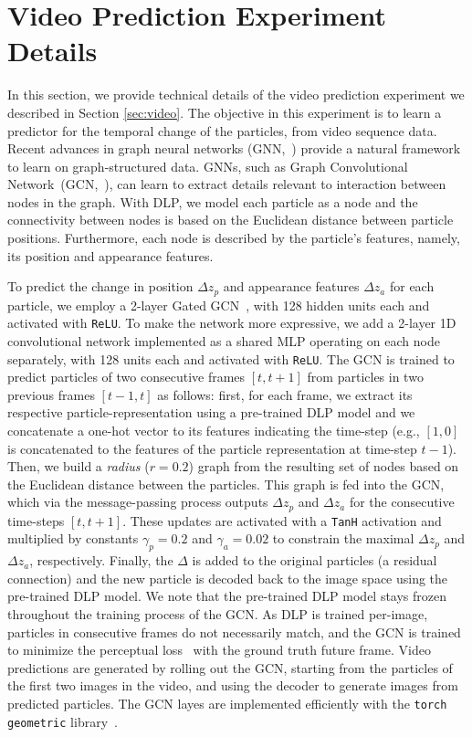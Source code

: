 \documentclass[nohyperref]{article}
\theoremstyle{plain}
\theoremstyle{definition}
\theoremstyle{remark}
\begin{document}
\section{Video Prediction Experiment Details}
\label{apndx:video}
In this section, we provide technical details of the video prediction experiment we described in Section \ref{sec:video}. The objective in this experiment is to learn a predictor for the temporal change of the particles, from video sequence data. Recent advances in graph neural networks (GNN,~\citealt{gnn09}) provide a natural framework to learn on graph-structured data. GNNs, such as Graph Convolutional Network~(GCN,~\citealt{kipf2016gcn}), can learn to extract details relevant to interaction between nodes in the graph. With DLP, we model each particle as a node and the connectivity between nodes is based on the Euclidean distance between particle positions. Furthermore, each node is described by the particle's features, namely, its position and appearance features.

To predict the change in position $\Delta z_p$ and appearance features $\Delta z_a$ for each particle, we employ a 2-layer Gated GCN~\citep{bresson2017gatedgcn}, with 128 hidden units each and activated with \texttt{ReLU}. To make the network more expressive, we add a 2-layer 1D convolutional network implemented as a shared MLP operating on each node separately, with 128 units each and activated with \texttt{ReLU}. The GCN is trained to predict particles of two consecutive frames $[t,t+1]$ from particles in two previous frames $[t-1,t]$ as follows: first, for each frame, we extract its respective particle-representation using a pre-trained DLP model and we concatenate a one-hot vector to its features indicating the time-step (e.g., $[1, 0]$ is concatenated to the features of the particle representation at time-step $t-1$). Then, we build a \textit{radius} ($r=0.2$) graph from the resulting set of nodes based on the Euclidean distance between the particles. This graph is fed into the GCN, which via the message-passing process outputs  $\Delta z_p$ and $\Delta z_a$ for the consecutive time-steps $[t,t+1]$. These updates are activated with a \texttt{TanH} activation and multiplied by constants $\gamma_p = 0.2$ and $\gamma_a=0.02$ to constrain the maximal $\Delta z_p$ and $\Delta z_a$, respectively. Finally, the $\Delta$ is added to the original particles (a residual connection) and the new particle is decoded back to the image space using the pre-trained DLP model. We note that the pre-trained DLP model stays frozen throughout the training process of the GCN. As DLP is trained per-image, particles in consecutive frames do not necessarily match, and the GCN is trained to minimize the perceptual loss~\citep{hoshen2019non} with the ground truth future frame. Video predictions are generated by rolling out the GCN, starting from the particles of the first two images in the video, and using the decoder to generate images from predicted particles. The GCN layes are implemented efficiently with the \texttt{torch geometric} library~\citep{feylensen19tgeom}.
 
\end{document}
